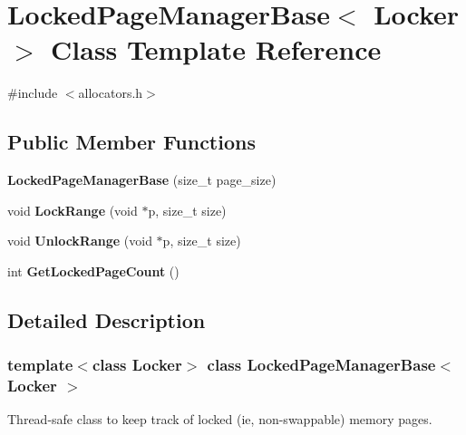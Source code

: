 \hypertarget{class_locked_page_manager_base}{}\section{Locked\+Page\+Manager\+Base$<$ Locker $>$ Class Template Reference}
\label{class_locked_page_manager_base}


{\ttfamily \#include $<$allocators.\+h$>$}

\subsection*{Public Member Functions}
\begin{DoxyCompactItemize}
\item 
\mbox{\label{class_locked_page_manager_base_ad1974eafb41a3cae3358e34b7896419a}} 
{\bfseries Locked\+Page\+Manager\+Base} (size\+\_\+t page\+\_\+size)
\item 
\mbox{\label{class_locked_page_manager_base_ae24ac08899505b892d451404133fa494}} 
void {\bfseries Lock\+Range} (void $\ast$p, size\+\_\+t size)
\item 
\mbox{\label{class_locked_page_manager_base_a34bcf7b9120295ed178fe9545ed229af}} 
void {\bfseries Unlock\+Range} (void $\ast$p, size\+\_\+t size)
\item 
\mbox{\label{class_locked_page_manager_base_a8074f7d1b43cc8dd34b3ba9cdb2eca50}} 
int {\bfseries Get\+Locked\+Page\+Count} ()
\end{DoxyCompactItemize}


\subsection{Detailed Description}
\subsubsection*{template$<$class Locker$>$\newline
class Locked\+Page\+Manager\+Base$<$ Locker $>$}

Thread-\/safe class to keep track of locked (ie, non-\/swappable) memory pages.

